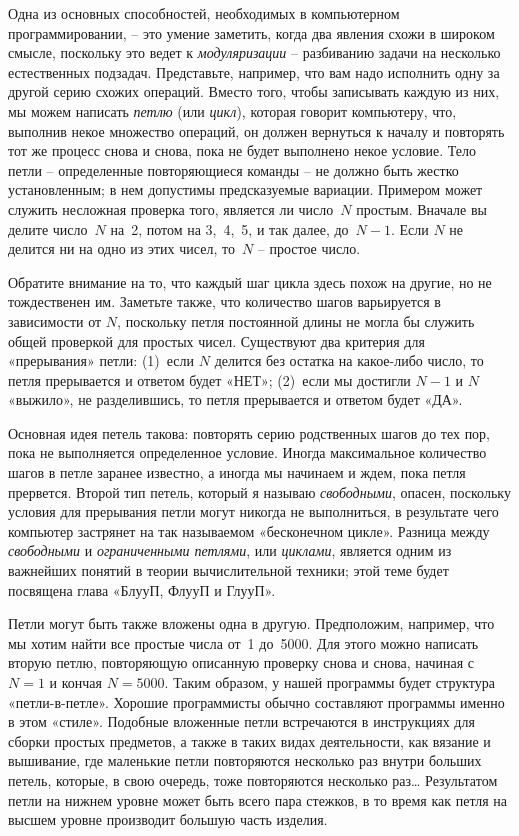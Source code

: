 \documentclass[../main.tex]{subfiles}
\begin{document}
Одна из основных способностей, необходимых в компьютерном программировании, \--- это умение заметить, когда два явления схожи в широком смысле, поскольку это ведет к \emph{модуляризации} \--- разбиванию задачи на несколько естественных подзадач. Представьте, например, что вам надо исполнить одну за другой серию схожих операций. Вместо того, чтобы записывать каждую из них, мы можем написать \emph{петлю} (или \emph{цикл}), которая говорит компьютеру, что, выполнив некое множество операций, он должен вернуться к началу и повторять тот же процесс снова и снова, пока не будет выполнено некое условие. Тело петли \--- определенные повторяющиеся команды \--- не должно быть жестко установленным; в нем допустимы предсказуемые вариации. Примером может служить несложная проверка того, является ли число~$N$ простым. Вначале вы делите число~$N$ на~2, потом на 3,~4,~5, и так далее, до~$N-1$. Если $N$ не делится ни на одно из этих чисел, то~$N$ \--- простое число.

Обратите внимание на то, что каждый шаг цикла здесь похож на другие, но не тождественен им. Заметьте также, что количество шагов варьируется в зависимости от $N$, поскольку петля постоянной длины не могла бы служить общей проверкой для простых чисел. Существуют два критерия для «прерывания» петли: (1)~если $N$ делится без остатка на какое-либо число, то петля прерывается и ответом будет «НЕТ»; (2)~если мы достигли $N-1$ и $N$ «выжило», не разделившись, то петля прерывается и ответом будет «ДА».

Основная идея петель такова: повторять серию родственных шагов до тех пор, пока не выполняется определенное условие. Иногда максимальное количество шагов в петле заранее известно, а иногда мы начинаем и ждем, пока петля прервется. Второй тип петель, который я называю \emph{свободными}, опасен, поскольку условия для прерывания петли могут никогда не выполниться, в результате чего компьютер застрянет на так называемом «бесконечном цикле». Разница между \emph{свободными} и \emph{ограниченными петлями}, или \emph{циклами}, является одним из важнейших понятий в теории вычислительной техники; этой теме будет посвящена глава «БлууП, ФлууП и ГлууП».

Петли могут быть также вложены одна в другую. Предположим, например, что мы хотим найти все простые числа от~1 до~5000. Для этого можно написать вторую петлю, повторяющую описанную проверку снова и снова, начиная с $N=1$ и кончая $N=5000$. Таким образом, у нашей программы будет структура «петли-в-петле». Хорошие программисты обычно составляют программы именно в этом «стиле». Подобные вложенные петли встречаются в инструкциях для сборки простых предметов, а также в таких видах деятельности, как вязание и вышивание, где маленькие петли повторяются несколько раз внутри больших петель, которые, в свою очередь, тоже повторяются несколько раз\ldots{} Результатом петли на нижнем уровне может быть всего пара стежков, в то время как петля на высшем уровне производит большую часть изделия.
\end{document}
